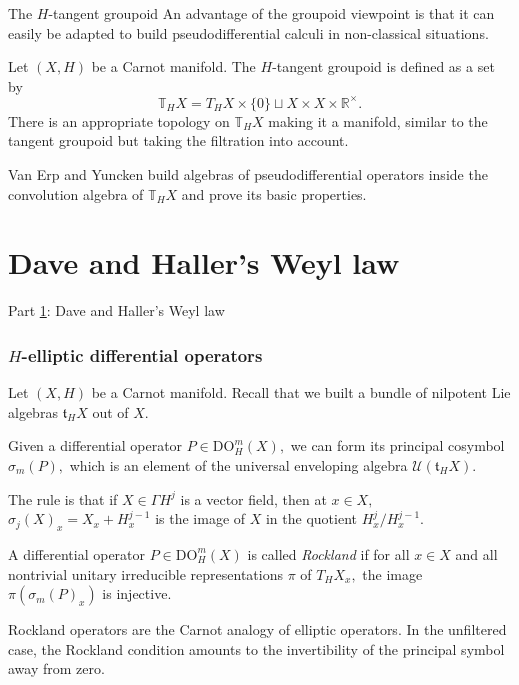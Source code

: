 \documentclass{beamer}
\numberwithin{equation}{section}
\theoremstyle{plain}
\theoremstyle{plain}
\theoremstyle{definition}
\theoremstyle{plain}
\theoremstyle{plain}
\theoremstyle{definition}
\newcommand{\Rl}{\mathbb{R}}
\newcommand{\Uc}{\mathcal{U}}
\newcommand{\tf}{\mathfrak{t}}
\newcommand{\Tb}{\mathbb{T}}
\begin{document}
%
%

\begin{frame}{The $H$-tangent groupoid}
  An advantage of the groupoid viewpoint is that it can easily be adapted to build pseudodifferential calculi in non-classical situations.
  \begin{definition}
      Let $(X,H)$ be a Carnot manifold. The $H$-tangent groupoid is defined as a set by
      \[
        \Tb_HX = T_HX\times \{0\}\sqcup X\times X\times \Rl^{\times}.
      \]
      There is an appropriate topology on $\Tb_HX$ making it a manifold, similar to the tangent groupoid but taking the filtration into account.
  \end{definition}
  Van Erp and Yuncken build algebras of pseudodifferential operators inside the convolution algebra of $\Tb_HX$ and prove its basic properties.
\end{frame}

\section{Dave and Haller's Weyl law}\label{weyl_section}


\begin{frame}
  \Huge{Part \ref{weyl_section}: Dave and Haller's Weyl law}
\end{frame}

\begin{frame}\frametitle{$H$-elliptic differential operators}
  Let $(X,H)$ be a Carnot manifold. Recall that we built a bundle of nilpotent Lie algebras $\tf_HX$ out of $X.$

  Given a differential operator $P \in \mathrm{DO}^m_H(X),$ we can form its principal cosymbol $\sigma_m(P),$ which is an element of the universal enveloping algebra $\Uc(\tf_HX).$

  The rule is that if $X\in \Gamma H^j$ is a vector field, then at $x\in X,$ $\sigma_j(X)_x = X_x+H_x^{j-1}$ is the image of $X$ in the quotient $H^{j}_x/H^{j-1}_x.$
  \begin{definition}
    A differential operator $P\in \mathrm{DO}^m_H(X)$ is called \emph{Rockland} if for all $x \in X$ and all nontrivial unitary irreducible representations $\pi$ of $T_HX_x,$ the image $\pi(\sigma_m(P)_x)$
    is injective.
  \end{definition}
  Rockland operators are the Carnot analogy of elliptic operators. In the unfiltered case, the Rockland condition amounts to the invertibility of the principal symbol away from zero.
\end{frame}
\end{document}

